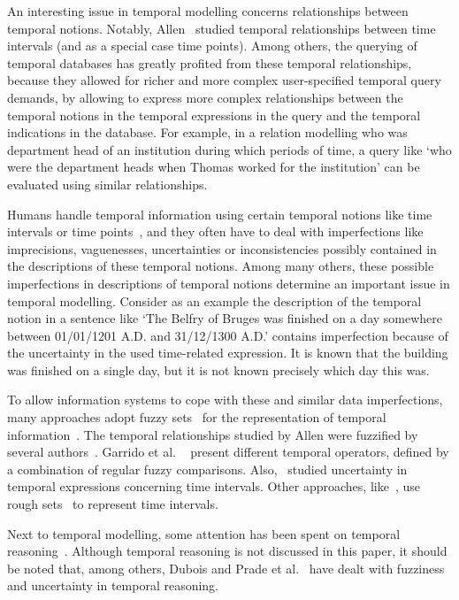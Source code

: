 An interesting issue in temporal modelling concerns relationships between temporal notions. Notably, Allen~\cite{Allen1983} studied temporal relationships between time intervals (and as a special case time points). Among others, the querying of temporal databases has greatly profited from these temporal relationships, because they allowed for richer and more complex user-specified temporal query demands, by allowing to express more complex relationships between the temporal notions in the temporal expressions in the query and the temporal indications in the database. For example, in a relation modelling who was department head of an institution during which periods of time, a query like `who were the department heads when Thomas worked for the institution' can be evaluated using similar relationships.

Humans handle temporal information using certain temporal notions like time intervals or time points~\cite{Dyreson1994}, and they often have to deal with imperfections like imprecisions, vaguenesses, uncertainties or inconsistencies possibly contained in the descriptions of these temporal notions. Among many others, these possible imperfections in descriptions of temporal notions determine an important issue in temporal modelling. Consider as an example the description of the temporal notion in a sentence like `The Belfry of Bruges was finished on a day somewhere between 01/01/1201 A.D. and 31/12/1300 A.D.' contains imperfection because of the uncertainty in the used time-related expression. It is known that the building was finished on a single day, but it is not known precisely which day this was.

To allow information systems to cope with these and similar data imperfections, many approaches adopt fuzzy sets~\cite{Zadeh1965} for the representation of temporal information~\cite{Mitra1994,Nagypal2003,Billiet2011,Dubois2003}. The temporal relationships studied by Allen were fuzzified by several authors~\cite{Ohlbach2004,Nagypal2003,Schockaert2008}. Garrido et al. ~\cite{Garrido2009} present different temporal operators, defined by a combination of regular fuzzy comparisons. Also,~\cite{Garrido2009,Pons2011} studied uncertainty in temporal expressions concerning time intervals. Other approaches, like~\cite{Qiang2009}, use rough sets~\cite{Pawlak1995} to represent time intervals.

Next to temporal modelling, some attention has been spent on temporal reasoning~\cite{Allen1983}. Although temporal reasoning is not discussed in this paper, it should be noted that, among others, Dubois and Prade et al.~\cite{Dubois2003,DuBois1989} have dealt with fuzziness and uncertainty in temporal reasoning.

